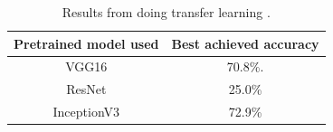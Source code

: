\begin{table}[h]
\centering
\begin{tabular}{ |c|c| } 
 \hline
 Pretrained model used &  Best achieved accuracy  \\ 
 \hline
 VGG16 & 70.8\%. \\ 
 \hline
 ResNet & 25.0\% \\ 
  \hline
 InceptionV3 & 72.9\% \\ 
 \hline
\end{tabular}
\caption{Results from doing transfer learning .}
\label{table:transferLearning}
\end{table}


\newpage
